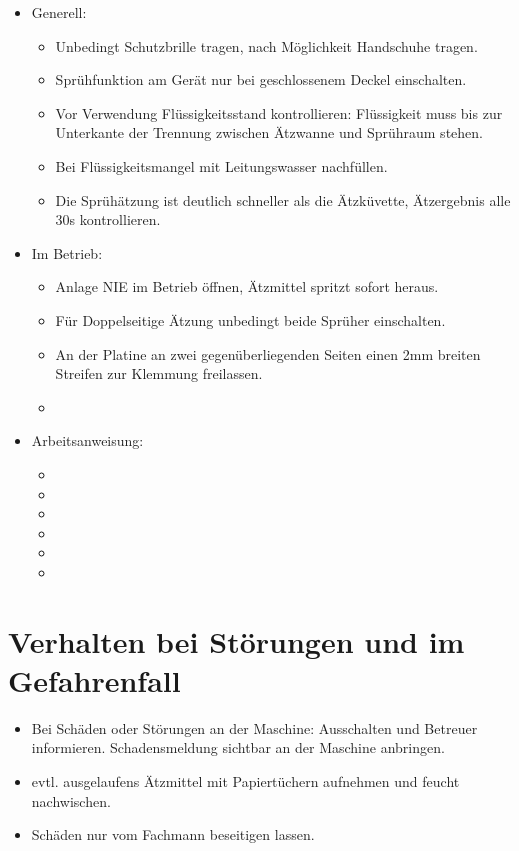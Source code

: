 \documentclass[fontsize=9pt]{scrartcl}
\newenvironment{smallitemize}{\begin{itemize}\itemsep -3pt}{\end{itemize}}
\begin{document}
\begin{itemize}
	\item Generell:
	\begin{smallitemize}
		\item Unbedingt Schutzbrille tragen, nach Möglichkeit Handschuhe tragen.
		\item Sprühfunktion am Gerät nur bei geschlossenem Deckel einschalten.
		\item Vor Verwendung Flüssigkeitsstand kontrollieren: Flüssigkeit muss bis zur Unterkante der Trennung zwischen Ätzwanne und Sprühraum stehen.
		\item Bei Flüssigkeitsmangel mit Leitungswasser nachfüllen.
		\item Die Sprühätzung ist deutlich schneller als die Ätzküvette, Ätzergebnis alle 30s kontrollieren.
		
	\end{smallitemize}
	\item Im Betrieb:
	\begin{smallitemize}
		\item Anlage NIE im Betrieb öffnen, Ätzmittel spritzt sofort heraus.
		\item Für Doppelseitige Ätzung unbedingt beide Sprüher einschalten.
		\item An der Platine an zwei gegenüberliegenden Seiten einen 2mm breiten Streifen zur Klemmung freilassen.
		\item 
		
	\end{smallitemize}
	\item Arbeitsanweisung:
	\begin{smallitemize}
		\item 
		\item 
		\item 
		\item 
		\item 
		\item 
		\end{smallitemize}
\end{itemize}

\section{Verhalten bei Störungen und im Gefahrenfall}
\begin{smallitemize}
	\item Bei Schäden oder Störungen an der Maschine: Ausschalten und Betreuer informieren. Schadensmeldung sichtbar an der Maschine anbringen.
	\item evtl. ausgelaufens Ätzmittel mit Papiertüchern aufnehmen und feucht nachwischen.
	\item Schäden nur vom Fachmann beseitigen lassen.
\end{smallitemize}
\end{document}
